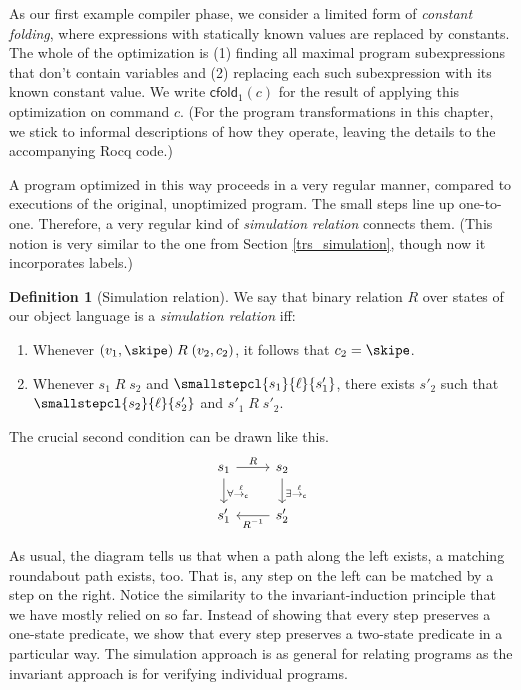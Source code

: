 \documentclass{amsbook}
\theoremstyle{definition}
\newtheorem{definition}[theorem]{Definition}
\theoremstyle{remark}
\numberwithin{section}{chapter}
\numberwithin{equation}{chapter}
\begin{document}
\newcommand{\cfold}[1]{\mathsf{cfold}_1(#1)}

As our first example compiler phase, we consider a limited form of \emph{constant folding}, where expressions with statically known values are replaced by constants.
The whole of the optimization is (1) finding all maximal program subexpressions that don't contain variables and (2) replacing each such subexpression with its known constant value.
We write $\cfold{c}$ for the result of applying this optimization on command $c$.
(For the program transformations in this chapter, we stick to informal descriptions of how they operate, leaving the details to the accompanying Rocq code.)

A program optimized in this way proceeds in a very regular manner, compared to executions of the original, unoptimized program.
The small steps line up one-to-one.
Therefore, a very regular kind of \emph{simulation relation} connects them.
(This notion is very similar to the one from Section \ref{trs_simulation}, though now it incorporates labels.)

\begin{definition}[Simulation relation]
  We say that binary relation $R$ over states of our object language is a \emph{simulation relation} iff:
  \begin{enumerate}
    \item Whenever $(v_1, \skipe) \; R \; (v_2, c_2)$, it follows that $c_2 = \skipe$.
    \item Whenever $s_1 \; R \; s_2$ and $\smallstepcl{s_1}{\ell}{s'_1}$, there exists $s'_2$ such that $\smallstepcl{s_2}{\ell}{s'_2}$ and $s'_1 \; R \; s'_2$. 
  \end{enumerate}
\end{definition}

The crucial second condition can be drawn like this.
\[
\begin{tikzcd}
s_1 \arrow{r}{R} \arrow{d}{\forall \stackrel{\ell}{\to_{\mathsf{c}}}} & s_2 \arrow{d}{\exists \stackrel{\ell}{\to_{\mathsf{c}}}} \\
s'_1 & s'_2 \arrow{l}{R^{-1}}
\end{tikzcd}
\]

\invariants
As usual, the diagram tells us that when a path along the left exists, a matching roundabout path exists, too.
That is, any step on the left can be matched by a step on the right.
Notice the similarity to the invariant-induction principle that we have mostly relied on so far.
Instead of showing that every step preserves a one-state predicate, we show that every step preserves a two-state predicate in a particular way.
The simulation approach is as general for relating programs as the invariant approach is for verifying individual programs.
\end{document}

